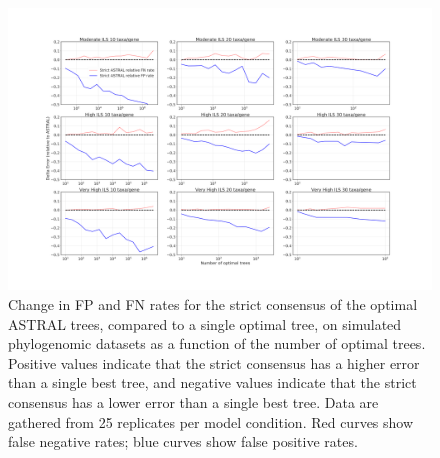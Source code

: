 \begin{figure}
  \centering
  \includegraphics[width=\textwidth]{siesta-supp-figs/astral_missing_ntrees_vs_err.png}
  \caption[Change in FP and FN rates for  the strict consensus of the optimal ASTRAL trees, compared to a single optimal tree, on simulated phylogenomic datasets as a
    function of the number of optimal trees.]{Change in FP and FN rates for  the strict consensus of the optimal ASTRAL trees, compared to a single optimal tree, on simulated phylogenomic datasets as a
    function of the number of optimal trees. Positive values indicate that the strict consensus has a higher error than a single best tree, and negative values indicate that the
    strict consensus has a lower error than a single best tree.  Data  are gathered from 25
    replicates per model condition. Red curves show false negative rates;
    blue curves show false positive rates.}
  \label{fig:supertree-consensus-comparison-9}
\end{figure}
